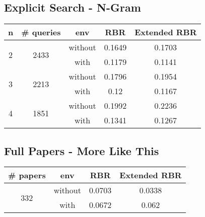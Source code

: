 \subsection{Explicit Search - N-Gram}
\begin{center}
  \begin{tabular}{ | c | c | c | c | c | }
    \hline
    \rowcolor{lightblue}
    \textbf{n} & \textbf{\# queries} & \textbf{env} & \textbf{RBR}  & \textbf{Extended RBR} \\ \hline
    \multirow{2}{*}{2} & \multirow{2}{*}{2433} & without & 0.1649 & 0.1703 \\ \cline{3-5}
                                              && with    & 0.1179 & 0.1141 \\ \hline \hline
    \multirow{2}{*}{3} & \multirow{2}{*}{2213} & without & 0.1796 & 0.1954 \\ \cline{3-5}
                                              && with    & 0.12   & 0.1167 \\ \hline \hline
    \multirow{2}{*}{4} & \multirow{2}{*}{1851} & without & 0.1992 & 0.2236 \\ \cline{3-5}
                                              && with    & 0.1341 & 0.1267 \\ \hline
  \end{tabular}
\end{center}

\subsection{Full Papers - More Like This}
\begin{center}
  \begin{tabular}{ | c | c | c | c | }
    \hline
    \rowcolor{lightblue}
    \textbf{\# papers} & \textbf{env} & \textbf{RBR} & \textbf{Extended RBR} \\ \hline
    \multirow{2}{*}{332} & without & 0.0703 & 0.0338 \\ \cline{2-4}
                         & with    & 0.0672 & 0.062  \\ \hline
  \end{tabular}
\end{center}

